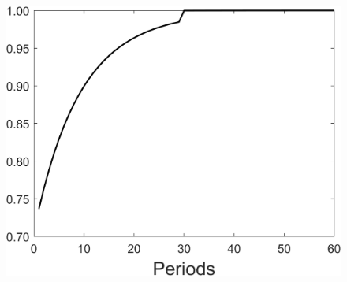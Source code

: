 \begin{figure}[h!!]
\begin{minipage}[]{0.32\textwidth}
\end{minipage}
\begin{minipage}[]{0.32\textwidth}
	\includegraphics[width=1\textwidth]{../codding_model/Own/figures/Rep_agent/staticRam_LF_separate_tauul_periods59_eppsilon0.40_zeta1.40_Ad08_Ac04_thetac0.70_thetad0.56_HetGrowth1_tauul0.181_util0_withtarget1_lgd0.png}
\end{minipage}
\end{figure}

